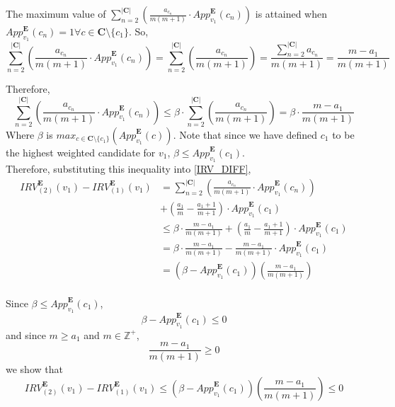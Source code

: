 \documentclass{article}
\begin{document}
The maximum value of $\sum^{|\boldsymbol{C}|}_{n = 2}{\left(\frac{a_{c_{n}}}{m(m+1)}\cdot{App}^{\boldsymbol{E}}_{v_1}(c_{n})\right)}$ is attained when ${App}^{\boldsymbol{E}}_{v_1}(c_{n}) = 1 \forall {c} \in \boldsymbol{C} \setminus \{c_1\}$. So,
\begin{equation}
\sum^{|\boldsymbol{C}|}_{n = 2}{\left(\frac{a_{c_{n}}}{m(m+1)}\cdot{App}^{\boldsymbol{E}}_{v_1}(c_{n})\right)} = \sum^{|\boldsymbol{C}|}_{n = 2}{\left(\frac{a_{c_{n}}}{m(m+1)}\right)} = \frac{\sum^{|\boldsymbol{C}|}_{n = 2}{a_{c_{n}}}}{m(m+1)} = \frac{m-a_1}{m(m+1)}
\end{equation}

Therefore,
\begin{equation}
\sum^{|\boldsymbol{C}|}_{n = 2}{\left(\frac{a_{c_{n}}}{m(m+1)}\cdot{App}^{\boldsymbol{E}}_{v_1}(c_{n})\right)} \leq \beta\cdot\sum^{|\boldsymbol{C}|}_{n = 2}{\left(\frac{a_{c_{n}}}{m(m+1)}\right)} = \beta\cdot\frac{m-a_1}{m(m+1)}
\end{equation}
Where $\beta$ is ${max}_{c \in \boldsymbol{C} \setminus \{c_1\}}\left({App}^{\boldsymbol{E}}_{v_1}(c)\right)$. Note that since we have defined $c_1$ to be the highest weighted candidate for $v_1$, $\beta \leq {App}^{\boldsymbol{E}}_{v_1}(c_1)$.\\

Therefore, substituting this inequality into \eqref{IRV_DIFF},
\begin{equation}
\begin{aligned}
{IRV}^{\boldsymbol{E}}_{(2)}(v_1) - {IRV}^{\boldsymbol{E}}_{(1)}(v_1)
&=  \sum^{|\boldsymbol{C}|}_{n = 2}{\left(\frac{a_{c_{n}}}{m(m+1)}\cdot{App}^{\boldsymbol{E}}_{v_1}(c_{n})\right)}\\
&+ \left(\frac{a_1}{m}-\frac{a_{1}+1}{m+1}\right)\cdot{App}^{\boldsymbol{E}}_{v_1}(c_1)\\
&\leq \beta\cdot\frac{m-a_1}{m(m+1)} + \left(\frac{a_1}{m}-\frac{a_{1}+1}{m+1}\right)\cdot{App}^{\boldsymbol{E}}_{v_1}(c_1)\\
&= \beta\cdot\frac{m-a_1}{m(m+1)} - \frac{m-a_1}{m(m+1)}\cdot{App}^{\boldsymbol{E}}_{v_1}(c_1)\\
&= \left(\beta - {App}^{\boldsymbol{E}}_{v_1}(c_1)\right)\left(\frac{m-a_1}{m(m+1)}\right)
\end{aligned} 
\end{equation}\\

Since $\beta \leq {App}^{\boldsymbol{E}}_{v_1}(c_1)$,
\begin{equation}
     \beta - {App}^{\boldsymbol{E}}_{v_1}(c_1) \leq 0
\end{equation}
and since $m \geq a_1$ and $m \in \mathbb{Z}^+$,
\begin{equation}
     \frac{m-a_1}{m(m+1)} \geq 0
\end{equation}
we show that 
\begin{equation}
     {IRV}^{\boldsymbol{E}}_{(2)}(v_1) - {IRV}^{\boldsymbol{E}}_{(1)}(v_1) \leq \left(\beta - {App}^{\boldsymbol{E}}_{v_1}(c_1)\right)\left(\frac{m-a_1}{m(m+1)}\right) \leq 0
\end{equation}\\
\end{document}
